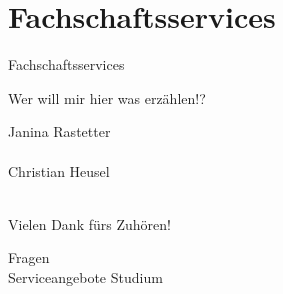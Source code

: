 
\section{Fachschaftsservices}
\begin{frame}{Fachschaftsservices}
\end{frame}

\begin{frame}{Wer will mir hier was erzählen!?}
    \vfill
    \begin{center}
        {\Large Janina Rastetter} \\
         \\
        \vspace{1em}
        {\Large Christian Heusel } \\
         \\
    \end{center}
\end{frame}

\begin{frame}{Vielen Dank fürs Zuhören!}
    \vfill
    \begin{center}
        \Huge Fragen \\[3.5pt]
        \normalsize Serviceangebote Studium
    \end{center}
\end{frame}


